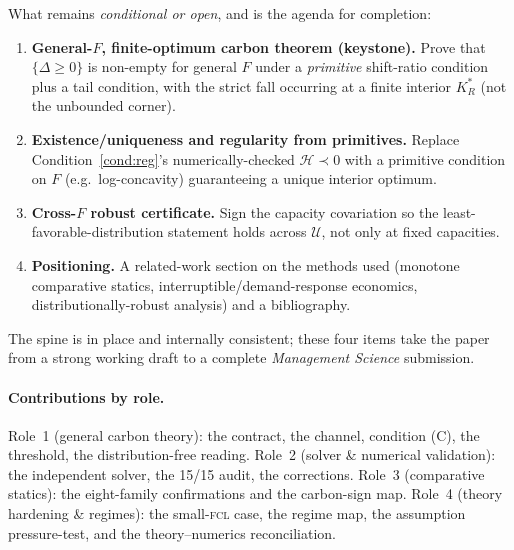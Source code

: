 \documentclass[11pt,reqno]{amsart}
\theoremstyle{plain}
\theoremstyle{definition}\newtheorem{condition}{Condition}\newtheorem{assumption}{Assumption}
\theoremstyle{remark}\newtheorem{remark}{Remark}
\newcommand{\KRs}{K_R^{*}}\newcommand{\KFs}{K_F^{*}}\newcommand{\KMs}{K_M^{*}}
\newcommand{\Ucal}{\mathcal U}
\begin{document}
What remains \emph{conditional or open}, and is the agenda for completion:
\begin{enumerate}[leftmargin=1.7em,topsep=2pt,itemsep=1.5pt]
  \item \textbf{General-$F$, finite-optimum carbon theorem (keystone).} Prove that
        $\{\Delta\ge0\}$ is non-empty for general $F$ under a \emph{primitive}
        shift-ratio condition plus a tail condition, with the strict fall occurring
        at a finite interior $\KRs$ (not the unbounded corner).
  \item \textbf{Existence/uniqueness and regularity from primitives.} Replace
        Condition~\ref{cond:reg}'s numerically-checked $\mathcal H\prec0$ with a
        primitive condition on $F$ (e.g.\ log-concavity) guaranteeing a unique
        interior optimum.
  \item \textbf{Cross-$F$ robust certificate.} Sign the capacity covariation so
        the least-favorable-distribution statement holds across $\Ucal$, not only
        at fixed capacities.
  \item \textbf{Positioning.} A related-work section on the methods used (monotone
        comparative statics, interruptible/demand-response economics,
        distributionally-robust analysis) and a bibliography.
\end{enumerate}
The spine is in place and internally consistent; these four items take the paper
from a strong working draft to a complete \emph{Management Science} submission.

\paragraph{Contributions by role.} Role~1 (general carbon theory): the contract,
the channel, condition (C), the threshold, the distribution-free reading. Role~2
(solver \& numerical validation): the independent solver, the 15/15 audit, the
corrections. Role~3 (comparative statics): the eight-family confirmations and the
carbon-sign map. Role~4 (theory hardening \& regimes): the small-\textsc{fcl}
case, the regime map, the assumption pressure-test, and the theory--numerics
reconciliation.
\end{document}
